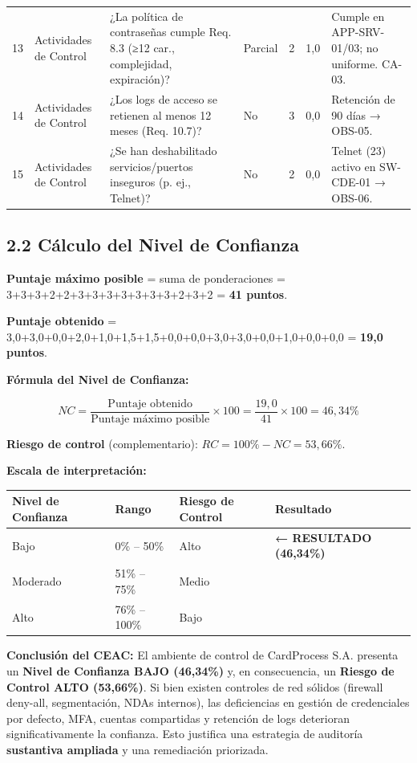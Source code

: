 \documentclass[11pt,a4paper]{article}
\begin{document}
\begin{tabularx}{\textwidth}{P{1.5cm}P{1.8cm}P{2.2cm}P{2cm}P{1.5cm}P{1.5cm}L}
13 & Actividades de Control & ¿La política de contraseñas cumple Req. 8.3 (≥12 car., complejidad, expiración)? & Parcial & 2 & 1,0 & Cumple en APP-SRV-01/03; no uniforme. CA-03. \\
14 & Actividades de Control & ¿Los logs de acceso se retienen al menos 12 meses (Req. 10.7)? & No & 3 & 0,0 & Retención de 90 días → OBS-05. \\
15 & Actividades de Control & ¿Se han deshabilitado servicios/puertos inseguros (p. ej., Telnet)? & No & 2 & 0,0 & Telnet (23) activo en SW-CDE-01 → OBS-06. \\
\bottomrule
\end{tabularx}

\subsection{2.2 Cálculo del Nivel de Confianza}

\textbf{Puntaje máximo posible} = suma de ponderaciones = 3+3+3+2+2+3+3+3+3+3+3+3+2+3+2 = \textbf{41 puntos}.

\textbf{Puntaje obtenido} = 3,0+3,0+0,0+2,0+1,0+1,5+1,5+0,0+0,0+3,0+3,0+0,0+1,0+0,0+0,0 = \textbf{19,0 puntos}.

\textbf{Fórmula del Nivel de Confianza:}

\[
NC = \frac{\text{Puntaje obtenido}}{\text{Puntaje máximo posible}} \times 100 = \frac{19{,}0}{41} \times 100 = 46{,}34\%
\]

\textbf{Riesgo de control} (complementario): $RC = 100\% - NC = 53{,}66\%$.

\textbf{Escala de interpretación:}

\begin{tabularx}{\textwidth}{P{2.5cm}P{3cm}P{2.5cm}L}
\toprule
\textbf{Nivel de Confianza} & \textbf{Rango} & \textbf{Riesgo de Control} & \textbf{Resultado} \\
\midrule
Bajo & 0\% – 50\% & Alto & \textbf{← RESULTADO (46,34\%)} \\
Moderado & 51\% – 75\% & Medio &  \\
Alto & 76\% – 100\% & Bajo &  \\
\bottomrule
\end{tabularx}

\textbf{Conclusión del CEAC:} El ambiente de control de CardProcess S.A. presenta un \textbf{Nivel de Confianza BAJO (46,34\%)} y, en consecuencia, un \textbf{Riesgo de Control ALTO (53,66\%)}. Si bien existen controles de red sólidos (firewall deny-all, segmentación, NDAs internos), las deficiencias en gestión de credenciales por defecto, MFA, cuentas compartidas y retención de logs deterioran significativamente la confianza. Esto justifica una estrategia de auditoría \textbf{sustantiva ampliada} y una remediación priorizada.
\end{document}
